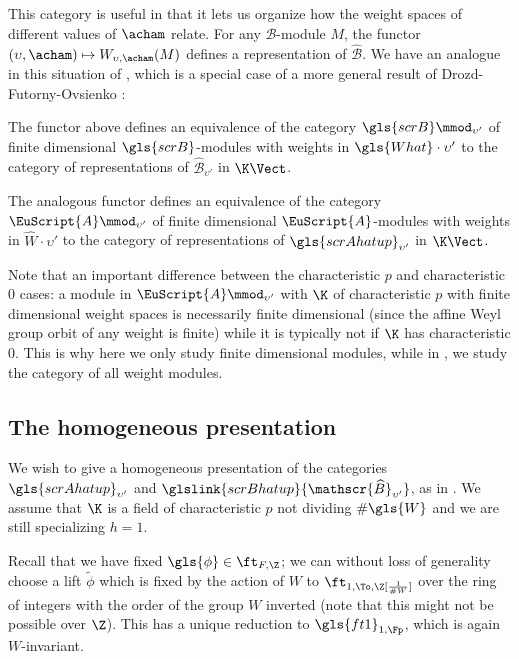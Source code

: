 This category is useful in that it lets us organize how the weight spaces
of different values of $\acham$ relate.  For any $\mathscr{B}$-module
$M$, the functor $(\upsilon, \acham)\mapsto W_{\upsilon,\acham}(M)$
defines a representation of $\widehat{\mathscr{B}}$.  We have an
analogue in this situation of \cite[Lemma 3.11]{WebSD}, which is a
special case of a more general result of Drozd-Futorny-Ovsienko
\cite[Th. 17]{FOD}:
\begin{lemma}
  The functor above defines an equivalence of the category $\gls{scrB}\mmod_{\upsilon'}$ of finite dimensional $\gls{scrB}$-modules with weights in $\gls{What}\cdot \upsilon'$ to
  the category of representations of
  $\widehat{\mathscr{B}}_{\upsilon'}$ in $\K\Vect$.

The analogous functor defines an equivalence of the category $\EuScript{A}\mmod_{\upsilon'}$ of finite dimensional
$\EuScript{A}$-modules  with weights in
$\widehat{W}\cdot \upsilon'$ to the category of
representations of $\gls{scrAhatup}_{\upsilon'}$ in $\K\Vect$.
\end{lemma} 
Note that an important difference
between the characteristic $p$ and characteristic $0$ cases:
a module in $\EuScript{A}\mmod_{\upsilon'}$ with $\K$ of characteristic $p$ with finite dimensional
weight spaces is necessarily finite dimensional (since the affine Weyl
group orbit of any weight is finite) while it is typically not if $\K$
has 
characteristic $0$. This is why here we only study finite dimensional
modules, while in \cite{WebSD}, we study the category of all weight modules.


\subsection{The homogeneous presentation}
\label{sec:homo}
We wish to give a homogeneous presentation of the categories
$\gls{scrAhatup}_{\upsilon'}$ and
$\glslink{scrBhatup}{\mathscr{\widehat{B}}_{\upsilon'}}$, as in
\cite[\S 4]{WebSD}.  We assume that $\K$ is a field of characteristic
$p$ not dividing $\# \gls{W}$ and we are still specializing $h=1$.  


Recall that we have fixed $\gls{\phi}\in \ft_{F,\Z}$; we can without
loss of generality choose a lift $\tilde{\phi}$ which is fixed by the action of $W$  to $\ft_{1,\To,
  \Z[\frac{1}{\# W}]}$ over the ring of integers with the order of the
group $W$ inverted 
(note that this might not be
possible over $\Z$).   This has a unique reduction to
$\gls{ft1}_{1,\Fp}$, which is again $W$-invariant.

